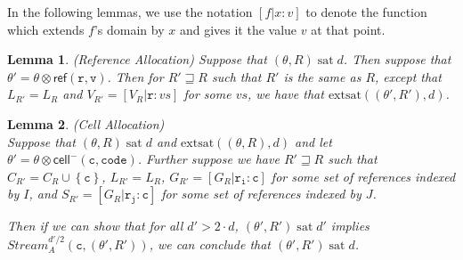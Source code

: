 \documentclass[preprint]{sigplanconf}
\newcommand{\setof}[1]{\left\{{#1}\right\}}
\newcommand{\term}[1]{\ensuremath{\mathtt{{#1}}}}
\newcommand{\Stream}{\mathit{Stream}}
\newcommand{\cellminus}[2]{\mathsf{cell}^{-}({#1}, {#2})}
\newcommand{\satisfy}[2]{{#1}\;\mathrm{sat}\;{#2}}
\newcommand{\satisfyext}[2]{\mathrm{extsat}({#1}, {#2})}
\newtheorem{lemma}{Lemma}
\begin{document}
In the following lemmas, we use the notation $[f|x:v]$ to denote the function which extends $f$'s domain 
by $x$ and gives it the value $v$ at that point. 

\begin{lemma}{(Reference Allocation)}
Suppose that $\satisfy{(\theta, R)}{d}$. Then suppose that $\theta' =
\theta \otimes \mathsf{ref}(\term{r,v})$.  Then for $R' \sqsupseteq R$
such that $R'$ is the same as $R$, except that $L_{R'} = L_R$ and 
$V_{R'} = [V_R|\term{r}:vs]$ for some $vs$, we have that 
$\satisfyext{(\theta', R')}{d}$.
\end{lemma}


\begin{lemma}{(Cell Allocation)} \\
Suppose that $\satisfy{(\theta, R)}{d}$ and
$\satisfyext{(\theta,R)}{d}$ and let $\theta' = \theta \otimes
\cellminus{\term{c}}{\term{code}}$. Further suppose we have $R'
\sqsupseteq R$ such that $C_{R'} = C_R \cup \setof{\term{c}}$, $L_{R'}
= L_R$, $G_{R'} = [G_R | \term{r_i : c}]$ for some set of references
indexed by $I$, and $S_{R'} = [G_R | \term{r_j : c}]$ for some set of
references indexed by $J$.

Then if we can show that for all $d' > 2 \cdot d$,
$\satisfy{(\theta',R')}{d'}$ implies $\Stream^{d'/2}_A(\term{c},
(\theta', R'))$, we can conclude that $\satisfy{(\theta',R')}{d}$. 
\end{lemma}
\end{document}
